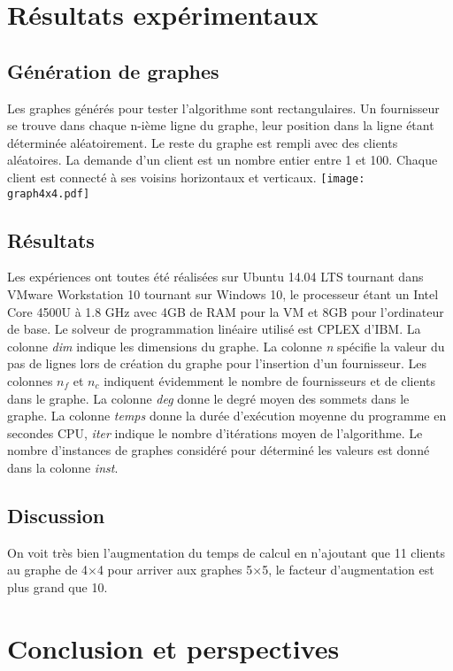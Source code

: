 \documentclass[12pt,a4paper]{article}
\begin{document}
\begin{multicols}{2}
\section{Résultats expérimentaux}
\subsection{Génération de graphes}
Les graphes générés pour tester l'algorithme sont rectangulaires. Un fournisseur se trouve dans chaque n-ième ligne du graphe, leur position dans la ligne étant déterminée aléatoirement. Le reste du graphe est rempli avec des clients aléatoires. La demande d'un client est un nombre entier entre 1 et 100. Chaque client est connecté à ses voisins horizontaux et verticaux.
\begingroup
    \centering
    \texttt{[image: graph4x4.pdf]}
    \label{fig:algo}
\endgroup
\subsection{Résultats}
Les expériences ont toutes été réalisées sur Ubuntu 14.04 LTS tournant dans VMware Workstation 10 tournant sur Windows 10, le processeur étant un Intel Core 4500U à 1.8 GHz avec 4GB de RAM pour la VM et 8GB pour l'ordinateur de base. Le solveur de programmation linéaire utilisé est CPLEX d'IBM.
La colonne \textit{dim} indique les dimensions du graphe. La colonne \textit{n} spécifie la valeur du pas de lignes lors de création du graphe pour l'insertion d'un fournisseur. Les colonnes $n_{f}$ et $n_{c}$ indiquent évidemment le nombre de fournisseurs et de clients dans le graphe. La colonne \textit{deg} donne le degré moyen des sommets dans le graphe. La colonne \textit{temps} donne la durée d'exécution moyenne du programme en secondes CPU, \textit{iter} indique le nombre d'itérations moyen de l'algorithme. Le nombre d'instances de graphes considéré pour déterminé les valeurs est donné dans la colonne \textit{inst}.
\subsection{Discussion}
On voit très bien l'augmentation du temps de calcul en n'ajoutant que 11 clients au graphe de 4$\times$4 pour arriver aux graphes 5$\times$5, le facteur d'augmentation est plus grand que 10.
\section{Conclusion et perspectives}


\end{multicols}
\end{document}
